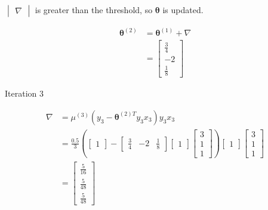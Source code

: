 \documentclass[a4paper, 10pt, twoside]{article}
\begin{document}
\begin{enumerate}[a)]
          $\begin{vmatrix} \nabla \end{vmatrix}$ is greater than the threshold, so $ \bm{\theta} $ is updated.

          \begin{align*}
              \bm{\theta}^{(2)}
               & = \bm{\theta}^{(1)} + \nabla \\
               & =
              \begin{bmatrix}
                  \frac{3}{4} \\ -2 \\ \frac{1}{8}
              \end{bmatrix}
          \end{align*}

          Iteration 3

          \begin{align*}
              \nabla
               & =
              \mu^{(3)}(y_3-\bm{\theta}^{(2)T}y_3x_3)y_3x_3 \\
               & =
              \frac{0.5}{3}
              \left(
              \begin{bmatrix}
                      1
                  \end{bmatrix}
              -
              \begin{bmatrix}
                      \frac{3}{4} & -2 & \frac{1}{8}
                  \end{bmatrix}
              \begin{bmatrix}
                      1
                  \end{bmatrix}
              \begin{bmatrix}
                      3 \\ 1 \\ 1
                  \end{bmatrix}
              \right)
              \begin{bmatrix}
                  1
              \end{bmatrix}
              \begin{bmatrix}
                  3 \\ 1 \\ 1
              \end{bmatrix}                    \\
               & =
              \begin{bmatrix}
                  \frac{5}{16} \\ \frac{5}{48} \\ \frac{5}{48}
              \end{bmatrix}
          \end{align*}


\end{enumerate}
\end{document}
